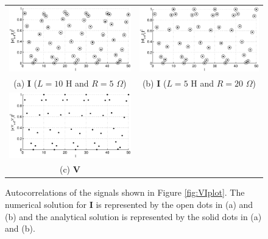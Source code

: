 \documentclass{article}[10pt]
\begin{document}
\begin{figure}[ht]
\begin{center}
\begin{tabular}{cc}
\includegraphics[scale=0.48]{IRCircuitResponseExampleL10R5_autocorrY.eps} &
\includegraphics[scale=0.48]{IRCircuitResponseExampleL5R20_autocorrY.eps} \\
(a) $\mathbf{I}$ ($L=10$ H and $R=5$ $\Omega$) & (b) $\mathbf{I}$ ($L=5$ H and $R=20$ $\Omega$)\\
\includegraphics[scale=0.48]{IRCircuitResponseExampleL10R5_autocorrX.eps} \\
(c) $\mathbf{V}$
\end{tabular}
\end{center}
\caption{Autocorrelations of the signals shown in Figure \ref{fig:VIplot}.  The numerical solution for $\mathbf{I}$ is represented by the open dots in (a) and (b) and the analytical solution is represented by the solid dots in (a) and (b).}
\label{fig:VIautocorr}
\end{figure}
\end{document}
